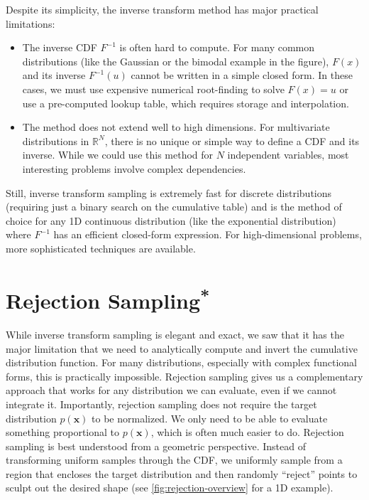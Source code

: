 Despite its simplicity, the inverse transform method has major practical limitations:
\begin{itemize}
    \item The inverse CDF $F^{-1}$ is often hard to compute. For many common distributions (like the Gaussian or the bimodal example in the figure), $F(x)$ and its inverse $F^{-1}(u)$ cannot be written in a simple closed form. In these cases, we must use expensive numerical root-finding to solve $F(x) = u$ or use a pre-computed lookup table, which requires storage and interpolation.
    \item The method does not extend well to high dimensions. For multivariate distributions in $\mathbb{R}^N$, there is no unique or simple way to define a CDF and its inverse. While we could use this method for $N$ independent variables, most interesting problems involve complex dependencies.
\end{itemize}
Still, inverse transform sampling is extremely fast for discrete distributions (requiring just a binary search on the cumulative table) and is the method of choice for any 1D continuous distribution (like the exponential distribution) where $F^{-1}$ has an efficient closed-form expression. For high-dimensional problems, more sophisticated techniques are available.

\section{\texorpdfstring{Rejection Sampling\textsuperscript{*}}{Rejection Sampling}}
While inverse transform sampling is elegant and exact, we saw that it has the major limitation that we need to analytically compute and invert the cumulative distribution function. For many distributions, especially with complex functional forms, this is practically impossible. Rejection sampling gives us a complementary approach that works for any distribution we can evaluate, even if we cannot integrate it. Importantly, rejection sampling does not require the target distribution $p(\mathbf{x})$ to be normalized. We only need to be able to evaluate something proportional to $p(\mathbf{x})$, which is often much easier to do. Rejection sampling is best understood from a geometric perspective. Instead of transforming uniform samples through the CDF, we uniformly sample from a region that encloses the target distribution and then randomly ``reject'' points to sculpt out the desired shape (see \autoref{fig:rejection-overview} for a 1D example).

